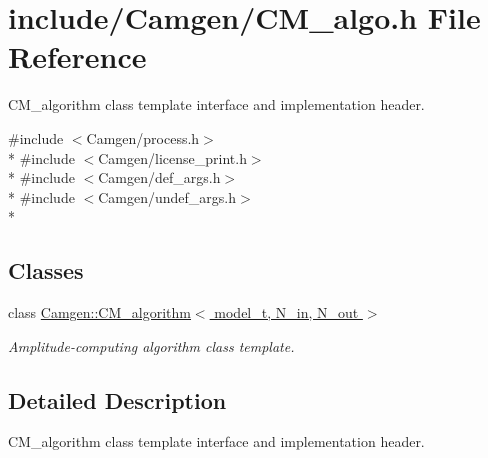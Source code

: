 \hypertarget{a00591}{\section{include/\-Camgen/\-C\-M\-\_\-algo.h File Reference}
\label{a00591}
}


C\-M\-\_\-algorithm class template interface and implementation header.  


{\ttfamily \#include $<$Camgen/process.\-h$>$}\\*
{\ttfamily \#include $<$Camgen/license\-\_\-print.\-h$>$}\\*
{\ttfamily \#include $<$Camgen/def\-\_\-args.\-h$>$}\\*
{\ttfamily \#include $<$Camgen/undef\-\_\-args.\-h$>$}\\*
\subsection*{Classes}
\begin{DoxyCompactItemize}
\item 
class \hyperlink{a00070}{Camgen\-::\-C\-M\-\_\-algorithm$<$ model\-\_\-t, N\-\_\-in, N\-\_\-out $>$}
\begin{DoxyCompactList}\small\item\em Amplitude-\/computing algorithm class template. \end{DoxyCompactList}\end{DoxyCompactItemize}


\subsection{Detailed Description}
C\-M\-\_\-algorithm class template interface and implementation header. 